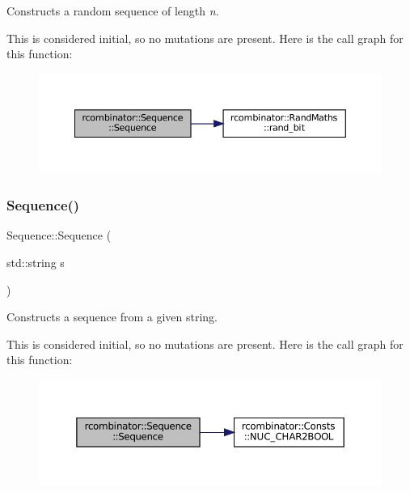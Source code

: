Constructs a random sequence of length {\itshape n}. 

This is considered initial, so no mutations are present. Here is the call graph for this function\+:
\nopagebreak
\begin{figure}[H]
\begin{center}
\leavevmode
\includegraphics[width=350pt]{classrcombinator_1_1Sequence_a04d0d6977316f2ab30844e584c4531ec_cgraph}
\end{center}
\end{figure}
\mbox{\label{classrcombinator_1_1Sequence_af5b3b62eba07f0e09f532fcf1681c289}} 
\subsubsection{\texorpdfstring{Sequence()}{Sequence()}\hspace{0.1cm}{\footnotesize\ttfamily [2/3]}}
{\footnotesize\ttfamily Sequence\+::\+Sequence (\begin{DoxyParamCaption}\item[{std\+::string}]{s }\end{DoxyParamCaption})}



Constructs a sequence from a given string. 

This is considered initial, so no mutations are present. Here is the call graph for this function\+:\nopagebreak
\begin{figure}[H]
\begin{center}
\leavevmode
\includegraphics[width=350pt]{classrcombinator_1_1Sequence_af5b3b62eba07f0e09f532fcf1681c289_cgraph}
\end{center}
\end{figure}
\mbox{\label{classrcombinator_1_1Sequence_af334c44bea806196b5037e61b0e831b1}} 
